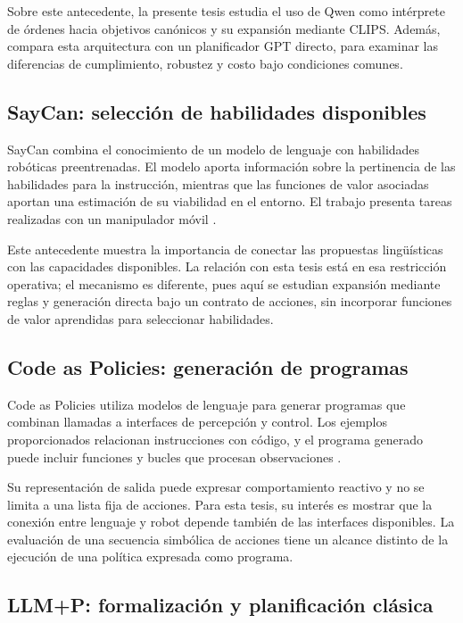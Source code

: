 Sobre este antecedente, la presente tesis estudia el uso de Qwen como intérprete de órdenes hacia objetivos canónicos y su expansión mediante CLIPS. Además, compara esta arquitectura con un planificador GPT directo, para examinar las diferencias de cumplimiento, robustez y costo bajo condiciones comunes.

\subsection{SayCan: selección de habilidades disponibles}

SayCan combina el conocimiento de un modelo de lenguaje con habilidades robóticas preentrenadas. El modelo aporta información sobre la pertinencia de las habilidades para la instrucción, mientras que las funciones de valor asociadas aportan una estimación de su viabilidad en el entorno. El trabajo presenta tareas realizadas con un manipulador móvil \cite{ahn2022saycan}.

Este antecedente muestra la importancia de conectar las propuestas lingüísticas con las capacidades disponibles. La relación con esta tesis está en esa restricción operativa; el mecanismo es diferente, pues aquí se estudian expansión mediante reglas y generación directa bajo un contrato de acciones, sin incorporar funciones de valor aprendidas para seleccionar habilidades.

\subsection{Code as Policies: generación de programas}

Code as Policies utiliza modelos de lenguaje para generar programas que combinan llamadas a interfaces de percepción y control. Los ejemplos proporcionados relacionan instrucciones con código, y el programa generado puede incluir funciones y bucles que procesan observaciones \cite{liang2022codeaspolicies}.

Su representación de salida puede expresar comportamiento reactivo y no se limita a una lista fija de acciones. Para esta tesis, su interés es mostrar que la conexión entre lenguaje y robot depende también de las interfaces disponibles. La evaluación de una secuencia simbólica de acciones tiene un alcance distinto de la ejecución de una política expresada como programa.

\subsection{LLM+P: formalización y planificación clásica}

